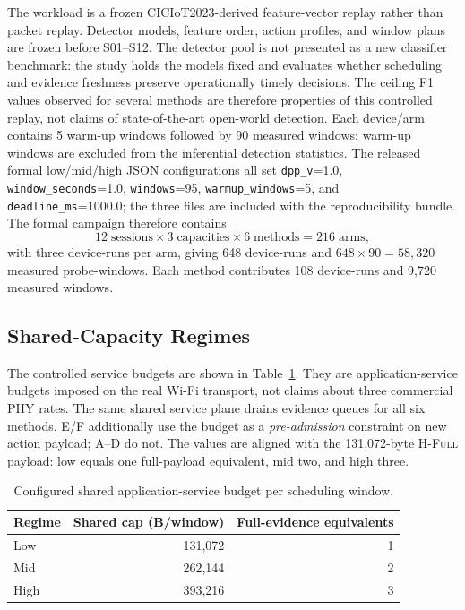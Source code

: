 \documentclass[10pt,journal]{IEEEtran}
\newcommand{\Hfull}{\textsc{H-Full}}
\begin{document}
The workload is a frozen CICIoT2023-derived feature-vector replay rather than packet replay. Detector models, feature order, action profiles, and window plans are frozen before S01--S12. The detector pool is not presented as a new classifier benchmark: the study holds the models fixed and evaluates whether scheduling and evidence freshness preserve operationally timely decisions. The ceiling F1 values observed for several methods are therefore properties of this controlled replay, not claims of state-of-the-art open-world detection. Each device/arm contains 5 warm-up windows followed by 90 measured windows; warm-up windows are excluded from the inferential detection statistics. The released formal low/mid/high JSON configurations all set \texttt{dpp\_v}=1.0, \texttt{window\_seconds}=1.0, \texttt{windows}=95, \texttt{warmup\_windows}=5, and \texttt{deadline\_ms}=1000.0; the three files are included with the reproducibility bundle. The formal campaign therefore contains
\[
12\;\text{sessions}\times 3\;\text{capacities}\times 6\;\text{methods}=216\;\text{arms},
\]
with three device-runs per arm, giving 648 device-runs and $648\times90=58{,}320$ measured probe-windows. Each method contributes 108 device-runs and 9,720 measured windows.

\subsection{Shared-Capacity Regimes}
The controlled service budgets are shown in Table~\ref{tab:capacity}. They are application-service budgets imposed on the real Wi-Fi transport, not claims about three commercial PHY rates. The same shared service plane drains evidence queues for all six methods. E/F additionally use the budget as a \emph{pre-admission} constraint on new action payload; A--D do not. The values are aligned with the 131,072-byte \Hfull{} payload: low equals one full-payload equivalent, mid two, and high three.

\begin{table}[t]
\centering
\caption{Configured shared application-service budget per scheduling window.}
\label{tab:capacity}
\small
\begin{tabular}{@{}lrr@{}}
\toprule
Regime & Shared cap (B/window) & Full-evidence equivalents\\
\midrule
Low  & 131,072 & 1\\
Mid  & 262,144 & 2\\
High & 393,216 & 3\\
\bottomrule
\end{tabular}
\end{table}
\end{document}
